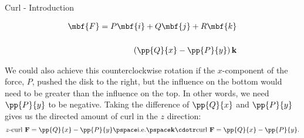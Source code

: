 \documentclass[11pt,english,
handout
]{beamer}
\begin{document}
\begin{frame}[t]{Curl - Introduction}
\small

\begin{minipage}{0.5\textwidth}
\begin{align*}
\mbf{F}=P\mbf{i}+Q\mbf{j}+R\mbf{k}\\[5mm]
\left(\pp{Q}{x}-\pp{P}{y}\right)\mathbf{k}
\end{align*}
\end{minipage}%
\begin{minipage}{0.5\textwidth}
\centering
{}
\end{minipage}

\lspace
We could also achieve this counterclockwise rotation if the $x$-component of the force, $P$, pushed the disk to the right, but the influence on the bottom would need to be greater than the influence on the top. In other words, we need $\pp{P}{y}$ to be negative. \pause Taking the difference of $\pp{Q}{x}$ and $\pp{P}{y}$ gives us the directed amount of curl in the $z$ direction:
\[
z\text{-curl }\mathbf{F}=\pp{Q}{x}-\pp{P}{y}\pspace \text{i.e.}\pspace \mathbf{k}\cdotr\text{curl }\mathbf{F}=\pp{Q}{x}-\pp{P}{y}.
\]
\end{frame}
\end{document}
